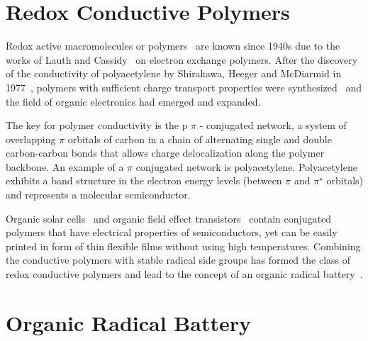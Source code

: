 \section{Redox Conductive Polymers}

Redox active macromolecules or polymers~\cite{Staudinger_1920} are known since 1940s due to the works of Lauth and Cassidy~\cite{Cassidy_1949} on electron exchange polymers. After the discovery of the conductivity of polyacetylene by Shirakawa, Heeger and McDiarmid in 1977~\cite{Shirakawa_1977}, polymers with sufficient charge transport properties were synthesized~\cite{} and the field of organic electronics had emerged and expanded. 

\par

The key for polymer conductivity is the p $\pi$ - conjugated network, a system of overlapping $\pi$ orbitals of carbon in a chain of alternating single and double carbon-carbon bonds that allows charge delocalization along the polymer backbone. An example of a $\pi$ conjugated network is polyacetylene. Polyacetylene exhibits a band structure in the electron energy levels (between $\pi$ and $\pi^\star$ orbitals) and represents a molecular semiconductor.

\par

Organic solar cells~\cite{Lee_1993} and organic field effect transistors~\cite{Koezuka_1987} contain conjugated polymers that have electrical properties of semiconductors, yet can be easily printed in form of thin flexible films without using high temperatures. Combining the conductive polymers with stable radical side groups has formed the class of redox conductive polymers and lead to the concept of an organic radical battery~\cite{Rohland_2021}.



\section{Organic Radical Battery}


